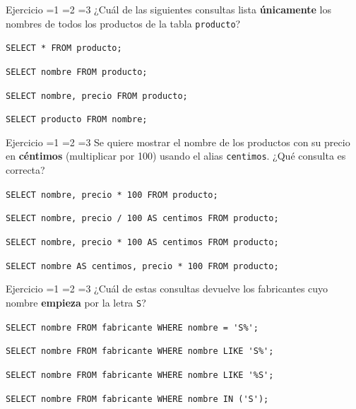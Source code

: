 \documentclass[12pt, a4paper]{article}
\newcommand{\estrella}{{\color{Goldenrod}\faStarSolid}}
\newcommand{\estrellavacia}{{\color{gray!45}\faStarSolid}}
\newcommand{\nivel}[1]{%
  \ifnum#1=1\estrella\estrellavacia\estrellavacia\fi
  \ifnum#1=2\estrella\estrella\estrellavacia\fi
  \ifnum#1=3\estrella\estrella\estrella\fi
}
\newcounter{numej}
\newcommand{\ej}{\stepcounter{numej}\thenumej}
\begin{document}
\begin{ejercicio}{Ejercicio \ej}{\nivel{1}}
¿Cuál de las siguientes consultas lista \textbf{únicamente} los nombres
de todos los productos de la tabla \texttt{producto}?

\begin{opciones}
  \item \lstinline|SELECT * FROM producto;|
  \item \lstinline|SELECT nombre FROM producto;|
  \item \lstinline|SELECT nombre, precio FROM producto;|
  \item \lstinline|SELECT producto FROM nombre;|
\end{opciones}
\end{ejercicio}

\begin{ejercicio}{Ejercicio \ej}{\nivel{1}}
Se quiere mostrar el nombre de los productos con su precio en
\textbf{céntimos} (multiplicar por 100) usando el alias
\texttt{centimos}. ¿Qué consulta es correcta?

\begin{opciones}
  \item \lstinline|SELECT nombre, precio * 100 FROM producto;|
  \item \lstinline|SELECT nombre, precio / 100 AS centimos FROM producto;|
  \item \lstinline|SELECT nombre, precio * 100 AS centimos FROM producto;|
  \item \lstinline|SELECT nombre AS centimos, precio * 100 FROM producto;|
\end{opciones}
\end{ejercicio}

\begin{ejercicio}{Ejercicio \ej}{\nivel{1}}
¿Cuál de estas consultas devuelve los fabricantes cuyo nombre
\textbf{empieza} por la letra \texttt{S}?

\begin{opciones}
  \item \lstinline|SELECT nombre FROM fabricante WHERE nombre = 'S%';|
  \item \lstinline|SELECT nombre FROM fabricante WHERE nombre LIKE 'S%';|
  \item \lstinline|SELECT nombre FROM fabricante WHERE nombre LIKE '%S';|
  \item \lstinline|SELECT nombre FROM fabricante WHERE nombre IN ('S');|
\end{opciones}
\end{ejercicio}
\end{document}
